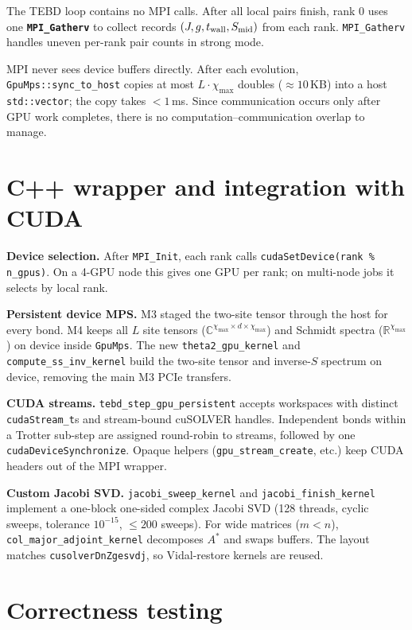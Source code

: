 \documentclass[11pt]{article}
\newcommand{\code}[1]{\texttt{#1}}
\begin{document}
The TEBD loop contains no MPI calls.  After all local pairs finish, rank 0
uses one \textbf{\code{MPI\_Gatherv}} to collect records
$(J,g,t_{\rm wall},S_{\rm mid})$ from each rank.  \code{MPI\_Gatherv} handles
uneven per-rank pair counts in strong mode.

MPI never sees device buffers directly.  After each evolution,
\code{GpuMps::sync\_to\_host} copies at most
$L\cdot\chi_{\max}$ doubles ($\approx10$\,KB) into a host
\code{std::vector}; the copy takes $<1$\,ms.  Since communication occurs only
after GPU work completes, there is no computation--communication overlap to
manage.

\section{C++ wrapper and integration with CUDA}

\textbf{Device selection.}
After \code{MPI\_Init}, each rank calls
\code{cudaSetDevice(rank \% n\_gpus)}.  On a 4-GPU node this gives one GPU
per rank; on multi-node jobs it selects by local rank.

\textbf{Persistent device MPS.}
M3 staged the two-site tensor through the host for every bond.  M4 keeps all
$L$ site tensors
($\mathbb{C}^{\chi_{\max}\times d\times\chi_{\max}}$) and Schmidt spectra
($\mathbb{R}^{\chi_{\max}}$) on device inside \code{GpuMps}.  The new
\code{theta2\_gpu\_kernel} and \code{compute\_ss\_inv\_kernel} build the
two-site tensor and inverse-$S$ spectrum on device, removing the main M3 PCIe
transfers.

\textbf{CUDA streams.}
\code{tebd\_step\_gpu\_persistent} accepts workspaces with distinct
\code{cudaStream\_t}s and stream-bound cuSOLVER handles.  Independent bonds
within a Trotter sub-step are assigned round-robin to streams, followed by
one \code{cudaDeviceSynchronize}.  Opaque helpers
(\code{gpu\_stream\_create}, etc.) keep CUDA headers out of the MPI wrapper.

\textbf{Custom Jacobi SVD.}
\code{jacobi\_sweep\_kernel} and \code{jacobi\_finish\_kernel} implement a
one-block one-sided complex Jacobi SVD (128 threads, cyclic sweeps,
tolerance $10^{-15}$, $\le200$ sweeps).  For wide matrices ($m<n$),
\code{col\_major\_adjoint\_kernel} decomposes $A^*$ and swaps buffers.  The
layout matches \code{cusolverDnZgesvdj}, so Vidal-restore kernels are reused.

\section{Correctness testing}
\end{document}
